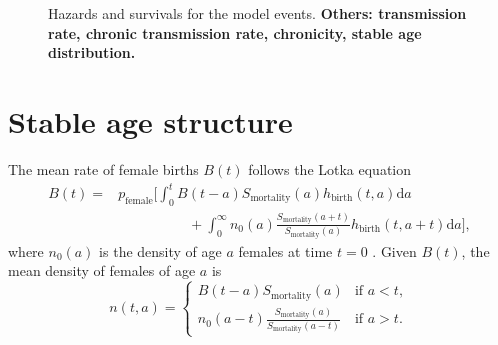 \documentclass[12pt]{article}
\newcommand{\md}{\mathrm{d}}
\begin{document}
\begin{figure}
  \centering
  
  \caption{Hazards and survivals for the model events.
    \textbf{Others: transmission rate, chronic transmission rate,
      chronicity, stable age distribution.}}
  \label{fig:distributions}
\end{figure}


\section{Stable age structure}
\label{stable_age_structure}

The mean rate of female births $B(t)$ follows the Lotka equation
\begin{equation}
  \label{lotka}
  \begin{split}
    B(t) =&
    p_{\text{female}} \bigg[
      \int_0^t B(t - a)
      S_{\text{mortality}}(a)
      h_{\text{birth}}(t, a) \md a
    \\
    & \quad\quad\quad\quad\quad {} +
      \int_0^{\infty} n_0(a)
      \frac{S_{\text{mortality}}(a + t)}{S_{\text{mortality}}(a)}
      h_{\text{birth}}(t, a + t) \md a
    \bigg],
  \end{split}
\end{equation}
where $n_0(a)$ is the density of age $a$ females at time $t = 0$
\autocite{harris_1963, kot_01}.
Given $B(t)$, the mean density of females of age $a$ is
\begin{equation}
  n(t, a) =
  \begin{cases}
    B(t - a) S_{\text{mortality}}(a)
    & \text{if $a < t$},
    \\
    n_0(a - t)
    \frac{S_{\text{mortality}}(a)}{S_{\text{mortality}}(a - t)}
    & \text{if $a > t$}.
  \end{cases}
\end{equation}
\end{document}
